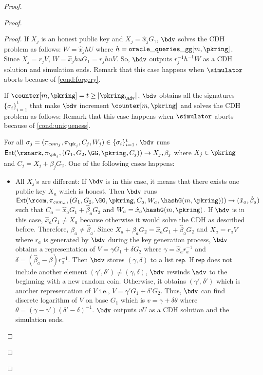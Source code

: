 \begin{proof}
\begin{proof}
\begin{proof}
			If $ X_j  $ is an honest public key and $ X_j = \hat{x}_jG_1 $, $ \bdv $ solves the CDH problem as follows: $ W = \hat{x}_j h U $ where $ h = \mathtt{oracle\_queries\_gg}[m, \pkring] $. Since $ X_j = r_j V $, $ W = \hat{x}_jhuG_1 =r_jhuV $. So, $ \bdv $ outputs $ r_j^{-1}h^{-1}W $ as a CDH solution and simulation ends. Remark that this case happens when $ \simulator $ aborts because of \ref{cond:forgery}.
			
			If $  \counter[m,\pkring] = t \geq |\pkring_\adv| $, $ \bdv $ obtains all the signatures $ \{\sigma_i\}_{i =1}^t $ that make $ \bdv $ increment $ \counter[m,\pkring] $ and solves the CDH problem as follows: Remark that this case happens when $ \simulator $ aborts because of \ref{cond:uniqueness}.
			
			For all $ \sigma_j = (\pi_{com_j},\pi_{\pk_j},C_j,W_j) \in \{\sigma_i\}_{i =1}^t $, $ \bdv $ runs $ \mathsf{Ext}(\rsnark,\pi_{\pk_j},(G_1,G_2, \GG,\pkring, C_j) ) \rightarrow X_j, \beta_j$ where $ X_j\in \pkring $ and $ C_j = X_j + \beta_j G_2 $. One of the following cases happens:
			
			\begin{itemize}
				\item All $ X_j$'s are different: If $ \bdv $ is in this case, it means that there exists one public key $ X_a $ which is honest. Then $ \bdv $ runs $ \mathsf{Ext}(\rcom,\pi_{com_a},(G_1,G_2, \GG,\pkring, C_a,W_a,\hashG(m,\pkring))) \rightarrow (\hat{x}_a,\hat{\beta}_a )$ such that $ C_a = \hat{x}_aG_1 + \hat{\beta}_a G_2 $ and $ W_a = \hat{x}_a \hashG(m,\pkring) $.  If $ \bdv $ is in this case, $ \hat{x}_aG_1\neq X_a $ because otherwise it would solve the CDH as described before. Therefore, $ \beta_a \neq \hat{\beta}_a $. Since $ X_a + \beta_a G_2 = \hat{x}_aG_1 + \hat{\beta}_a G_2  $ and $ X_a = r_aV $ where $ r_a $ is generated by $ \bdv $ during the key generation process, $ \bdv $ obtains a representation of $ V = \gamma G_1 + \delta G_2 $ where $ \gamma = \hat{x}_ar^{-1}_a  $ and $ \delta = (\hat{\beta}_a -\beta)r_a^{-1} $. Then $ \bdv $ stores $ (\gamma, \delta) $ to a list $ \mathsf{rep} $. If $ \mathsf{rep} $ does not include another element $ (\gamma', \delta')  \neq (\gamma, \delta) $, $ \bdv $ rewinds $ \adv $ to the beginning with a new random coin.  Otherwise, it obtains $ (\gamma', \delta') $ which is another representation of $ V $ i.e., $ V = \gamma' G_1 + \delta' G_2 $. Thus, $ \bdv $ can find discrete logarithm of $ V $ on base $ G_1 $ which is $ v = \gamma + \delta \theta $ where $ \theta = (\gamma - \gamma')(\delta' - \delta)^{-1} $. $ \bdv $ outputs $ vU $ as a CDH solution and the simulation ends.
				

\end{itemize}
\end{proof}
\end{proof}
\end{proof}
